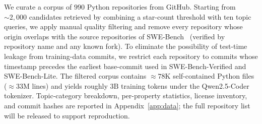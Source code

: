 We curate a corpus of $990$ Python repositories from GitHub. Starting from
$\sim\!2{,}000$ candidates retrieved by combining a star-count threshold
with ten topic queries, we apply manual quality filtering and remove every
repository whose origin overlaps with the source repositories of
SWE-Bench~\citep{swebench} (verified by repository name and any known
fork). To eliminate the possibility of test-time leakage from
training-data commits, we restrict each repository to commits whose
timestamp precedes the earliest base-commit used in SWE-Bench-Verified
and SWE-Bench-Lite. The filtered corpus contains $\approx 78\mathrm{K}$
self-contained Python files ($\approx 33\mathrm{M}$ lines) and yields
roughly $3\mathrm{B}$ training tokens under the Qwen2.5-Coder tokenizer.
Topic-category breakdown, per-property statistics, license inventory, and
commit hashes are reported in Appendix~\ref{app:data}; the full
repository list will be released to support reproduction.



